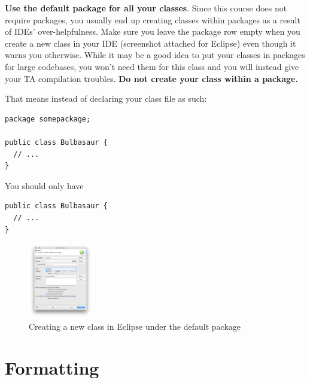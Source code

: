 \documentclass[10pt,DIV=23,landscape]{scrartcl}
\begin{document}
\begin{paracol}{3}
\begin{nthcolumn}{0}
\textbf{Use the default package for all your classes}. Since this course does not require packages, you usually end up creating
classes within packages as a result of IDEs' over-helpfulness. Make sure
you leave the package row empty when you create a new class in your IDE
(screenshot attached for Eclipse) even though it warns you otherwise.
While it may be a good idea to put your classes in packages for large
codebases, you won't need them for this class and you will instead give
your TA compilation troubles. \textbf{Do not create your class within a
package.}
\end{nthcolumn}

\begin{nthcolumn}{1}
That means instead of declaring your class file as such:
\begin{lstlisting}
package somepackage;

public class Bulbasaur {
  // ...
}
\end{lstlisting}

You should only have

\begin{lstlisting}
public class Bulbasaur {
  // ...
}
\end{lstlisting}
\end{nthcolumn}

\begin{nthcolumn}{2}
\begin{figure}[H]
\centering
\includegraphics[width=0.25\textwidth]{default-package.png}
\caption{Creating a new class in Eclipse under the default package}
\end{figure}
\end{nthcolumn}

\end{paracol}

\section{Formatting}\label{formatting}
\end{document}
